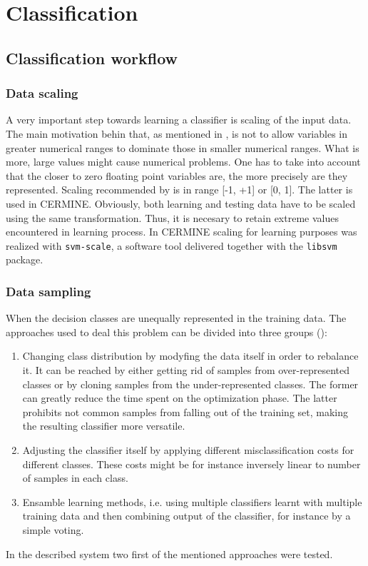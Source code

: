 \chapter{Classification}
\section{Classification workflow}
\subsection{Data scaling}
A very important step towards learning a classifier is scaling of the input data. The main motivation behin that, as mentioned in \cite{Chih-WeiHsu2010}, is not to allow variables in greater numerical ranges to dominate those in smaller numerical ranges. What is more, large values might cause numerical problems. One has to take into account that the closer to zero floating point variables are, the more precisely are they represented. Scaling recommended by \cite{Chih-WeiHsu2010} is in range [-1, +1] or  [0, 1]. The latter is used in CERMINE. Obviously, both learning and testing data have to be scaled using the same transformation. Thus, it is necesary to retain extreme values encountered in learning process.
In CERMINE scaling for learning purposes was realized with \verb+svm-scale+, a software tool delivered together with the \verb+libsvm+ package.
\subsection{Data sampling}
When the decision classes are unequally represented in the training data. The approaches used to deal this problem can be divided into three groups (\cite{Choi}):
\begin{enumerate}
\item Changing class distribution by modyfing the data itself in order to rebalance it. It can be reached by either getting rid of samples from over-represented classes or by cloning samples from the under-represented classes. The former can greatly reduce the time spent on the optimization phase. The latter prohibits not common samples from falling out of the training set, making the resulting classifier more versatile.
\item Adjusting the classifier itself by applying different misclassification costs for different classes. These costs might be for instance inversely linear to number of samples in each class.
\item Ensamble learning methods, i.e. using multiple classifiers learnt with multiple training data and then combining output of the classifier, for instance by a simple voting.
\end{enumerate}
In the described system two first of the mentioned approaches were tested.
